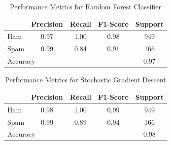 \documentclass[12pt]{article}
\begin{document}
\begin{table}[!htbp]
\centering
\begin{tabular}{|l|c|c|c|c|}
\hline
          & Precision & Recall & F1-Score & Support \\ \hline
Ham       & 0.97      & 1.00   & 0.98     & 949     \\ \hline
Spam      & 0.99      & 0.84   & 0.91     & 166     \\ \hline
\multicolumn{4}{|l|}{Accuracy}             & 0.97    \\ \hline
\end{tabular}
\caption{Performance Metrics for Random Forest Classifier}
\label{tab:performance_metrics_rf}
\end{table}

\begin{table}[!htbp]
\centering
\begin{tabular}{|l|c|c|c|c|}
\hline
          & Precision & Recall & F1-Score & Support \\ \hline
Ham       & 0.98      & 1.00   & 0.99     & 949     \\ \hline
Spam      & 0.99      & 0.89   & 0.94     & 166     \\ \hline
\multicolumn{4}{|l|}{Accuracy}             & 0.98    \\ \hline
\end{tabular}
\caption{Performance Metrics for Stochastic Gradient Descent}
\label{tab:performance_metrics_sg}
\end{table}

\end{document}
